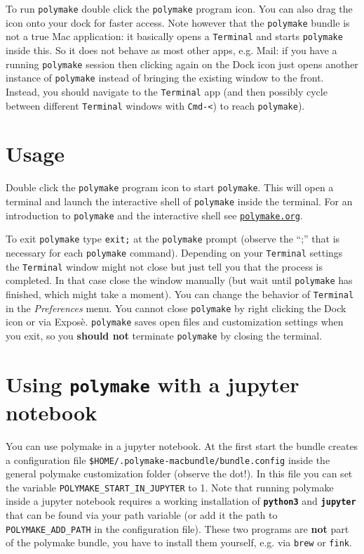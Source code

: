 \documentclass[a4paper]{amsart}
\newcommand{\polymake}{\texttt{polymake}\xspace}
\begin{document}
To run \polymake double click the \polymake program icon. You can also drag the icon onto your dock for faster access. Note however that the \polymake bundle is not a true Mac application: it basically opens a \texttt{Terminal} and starts \polymake inside this. So it does not behave as most other apps, e.g. Mail: if you have a running \polymake session then clicking again on the Dock icon just opens another instance of \polymake instead of bringing the existing window to the front. Instead, you should navigate to the \texttt{Terminal} app (and then possibly cycle between different \texttt{Terminal} windows with \texttt{Cmd-<}) to reach \polymake).

\section*{Usage}

Double click the \polymake program icon to start \polymake. This will open a terminal and launch the interactive shell of \polymake inside the terminal. For an introduction to \polymake and the interactive shell see \href{http://polymake.org}{\tt polymake.org}\;.

To exit \polymake type \texttt{exit;} at the \polymake prompt (observe the ``;'' that is necessary for each \polymake command). Depending on your \texttt{Terminal} settings the \texttt{Terminal} window might not close but just tell you that the process is completed. In that case close the window manually (but wait until \polymake has finished, which might take a moment). You can change the behavior of \texttt{Terminal} in the \textit{Preferences} menu.  You cannot close \polymake by right clicking the Dock icon or via Expos\`e. \polymake saves open files and customization settings when you exit, so you \textbf{should not} terminate \polymake by closing the terminal.

\section*{Using \polymake with a jupyter notebook}

You can use polymake in a jupyter notebook. At the first start the bundle creates a configuration file \texttt{\$HOME/.polymake-macbundle/bundle.config} inside the general polymake customization folder (observe the dot!). In this file you can set the variable \texttt{POLYMAKE\_START\_IN\_JUPYTER} to 1. Note that running polymake inside a jupyter notebook requires a working installation of \texttt{\bf python3} and \texttt{\bf jupyter} that can be found via your path variable (or add it the path to \texttt{POLYMAKE\_ADD\_PATH} in the configuration file). These two programs are \textbf{not} part of the polymake bundle, you have to install them yourself, e.g. via \texttt{brew} or \texttt{fink}.
\end{document}
